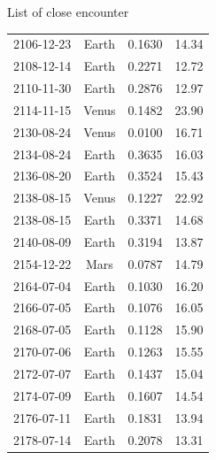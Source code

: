 \documentclass[final]{beamer}
\newlength{\onecolwid}
\begin{document}
\begin{frame}[t]
\begin{columns}[t]
\begin{column}{\onecolwid}
\begin{alertblock}{List of close encounter}
\begin{table}
\begin{tabular}{l c c c}
2106-12-23 & Earth & 0.1630 & 14.34 \\ 
2108-12-14 & Earth & 0.2271 & 12.72 \\ 
2110-11-30 & Earth & 0.2876 & 12.97 \\ 
2114-11-15 & Venus & 0.1482 & 23.90 \\ 
2130-08-24 & Venus & 0.0100 & 16.71 \\ 
2134-08-24 & Earth & 0.3635 & 16.03 \\ 
2136-08-20 & Earth & 0.3524 & 15.43 \\ 
2138-08-15 & Venus & 0.1227 & 22.92 \\ 
2138-08-15 & Earth & 0.3371 & 14.68 \\ 
2140-08-09 & Earth & 0.3194 & 13.87 \\ 
2154-12-22 & Mars & 0.0787 & 14.79 \\ 
2164-07-04 & Earth & 0.1030 & 16.20 \\ 
2166-07-05 & Earth & 0.1076 & 16.05 \\ 
2168-07-05 & Earth & 0.1128 & 15.90 \\ 
2170-07-06 & Earth & 0.1263 & 15.55 \\ 
2172-07-07 & Earth & 0.1437 & 15.04 \\ 
2174-07-09 & Earth & 0.1607 & 14.54 \\ 
2176-07-11 & Earth & 0.1831 & 13.94 \\ 
2178-07-14 & Earth & 0.2078 & 13.31 \\ 
\bottomrule
\end{tabular}
\end{table}
\end{alertblock}

\end{column} 


\end{columns} 
\end{frame}
\end{document}

